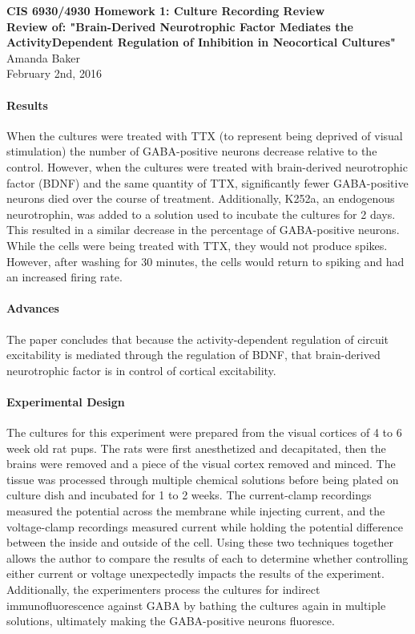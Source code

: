 \documentclass[11pt]{article}
\begin{document}
\begin{center}
{\large {\bf CIS 6930/4930 Homework 1: Culture Recording Review}}\\
{\normalsize {\bf Review of: "Brain-Derived Neurotrophic Factor Mediates the ActivityDependent
Regulation of Inhibition in Neocortical Cultures"}}\\
Amanda Baker \\
February 2nd, 2016 \\
\end{center}

\paragraph{Results}
When the cultures were treated with TTX (to represent being deprived of visual stimulation)
the number of GABA-positive neurons decrease relative to the control.  However,
when the cultures were treated with brain-derived neurotrophic factor (BDNF) and
the same quantity of TTX, significantly
fewer GABA-positive neurons died over the course of treatment.  Additionally, K252a,
an endogenous neurotrophin, was added to a solution used to incubate the cultures
for 2 days.  This resulted in a similar decrease in the percentage of GABA-positive
neurons.  While the cells were being treated with TTX, they would not produce spikes.
However, after washing for 30 minutes, the cells would return to spiking and had
an increased firing rate.  \\

\paragraph{Advances}
The paper concludes that because the activity-dependent regulation of circuit excitability
is mediated through the regulation of BDNF, that brain-derived neurotrophic factor
is in control of cortical excitability. \\

\paragraph{Experimental Design}
The cultures for this experiment were prepared from the visual cortices of 4 to 6
week old rat pups.  The rats were first anesthetized and decapitated, then the brains
were removed and a piece of the visual cortex removed and minced.  The tissue was
processed through multiple chemical solutions before being plated on culture dish
and incubated for 1 to 2 weeks.  The current-clamp recordings measured the potential
across the membrane while injecting current, and the voltage-clamp recordings measured
current while holding the potential difference between the inside and outside of
the cell.  Using these two techniques together allows the author to compare the
results of each to determine whether controlling either current or voltage unexpectedly
impacts the results of the experiment.  Additionally, the experimenters process
the cultures for indirect immunofluorescence against GABA by bathing the cultures
again in multiple solutions, ultimately making the GABA-positive neurons fluoresce. \\
\end{document}
